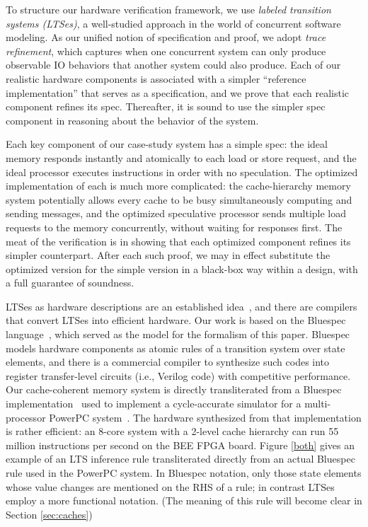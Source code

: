 To structure our hardware verification framework, we use \emph{labeled
transition systems (LTSes)}, a well-studied approach in the world of
concurrent software modeling.  As our unified notion of specification and
proof, we adopt \emph{trace refinement}, which captures when one concurrent
system can only produce observable IO behaviors that another system could also
produce.  Each of our realistic hardware components is associated with a
simpler ``reference implementation'' that serves as a specification, and we
prove that each realistic component refines its spec.  Thereafter, it is sound
to use the simpler spec component in reasoning about the behavior of the
system.

Each key component of our case-study system has a simple spec: the ideal memory
responds instantly and atomically to each load or store request, and the ideal
processor executes instructions in order with no speculation.  The optimized
implementation of each is much more complicated: the cache-hierarchy memory
system potentially allows every cache to be busy simultaneously computing and
sending messages, and the optimized speculative processor sends multiple load
requests to the memory concurrently, without waiting for responses first.  The meat
of the verification is in showing that each optimized component refines its
simpler counterpart.  After each such proof, we may in effect substitute the
optimized version for the simple version in a black-box way within a design,
with a full guarantee of soundness.

LTSes as hardware descriptions are an established
idea~\cite{HoeArvind:TRSSynthesis1, Hoe:TCAD}, and there are compilers that
convert LTSes into efficient hardware.  Our work is based on the Bluespec
language~\cite{BSV:LangRef, Bluespec:TFRG}, which served as the model for the
formalism of this paper.  Bluespec models hardware components as atomic rules
of a transition system over state elements, and there is a commercial compiler
to synthesize such codes into register transfer-level circuits (i.e., Verilog code) with
competitive performance.  Our cache-coherent memory system is directly
transliterated from a Bluespec
implementation~\cite{DNA:CoherenceImplementation} used to implement a
cycle-accurate simulator for a multi-processor PowerPC system~\cite{Khan:PowerPc}. The hardware synthesized
from that implementation is rather efficient: an 8-core system with a 2-level
cache hierarchy can run 55 million instructions per second on the BEE FPGA
board\cite{bee2}. Figure \ref{both} gives an example of an LTS inference rule
transliterated directly from an actual Bluespec rule used in the PowerPC
system. In Bluespec notation, only those state elements whose value changes are
mentioned on the RHS of a rule; in
contrast LTSes employ a more functional notation. (The meaning of this rule
will become clear in Section \ref{sec:caches})

